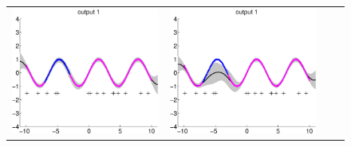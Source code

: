 \begin{figure}
\centering
\begin{tabular}{cccc}
\includegraphics[scale=0.2]{figures/toy-slfm-y1.eps} &
\includegraphics[scale=0.2]{figures/toy-svigp-y1.eps} &

\end{tabular}
\end{figure}
